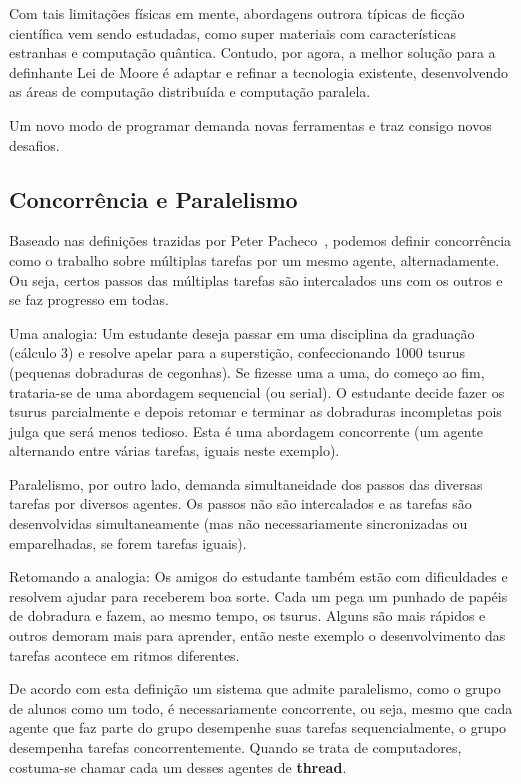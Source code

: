 \documentclass{article}
\begin{document}
Com tais limitações físicas em mente, abordagens outrora típicas de ficção científica vem sendo estudadas, como super materiais com características estranhas e computação quântica. Contudo, por agora, a melhor solução para a definhante Lei de Moore é adaptar e refinar a tecnologia existente, desenvolvendo as áreas de computação distribuída e computação paralela.

Um novo modo de programar demanda novas ferramentas e traz consigo novos desafios.

\subsection{Concorrência e Paralelismo}
\label{ssec:concorrencia e paralelismo}

Baseado nas definições trazidas por Peter Pacheco~\cite{pacheco11}, podemos definir concorrência como o trabalho sobre múltiplas tarefas por um mesmo agente, alternadamente. Ou seja, certos passos das múltiplas tarefas são intercalados uns com os outros e se faz progresso em todas.

Uma analogia: Um estudante deseja passar em uma disciplina da graduação (cálculo 3) e resolve apelar para a superstição, confeccionando 1000 tsurus (pequenas dobraduras de cegonhas). Se fizesse uma a uma, do começo ao fim, trataria-se de uma abordagem sequencial (ou serial). O estudante decide fazer os tsurus parcialmente e depois retomar e terminar as dobraduras incompletas pois julga que será menos tedioso. Esta é uma abordagem concorrente (um agente alternando entre várias tarefas, iguais neste exemplo).

Paralelismo, por outro lado, demanda simultaneidade dos passos das diversas tarefas por diversos agentes. Os passos não são intercalados e as tarefas são desenvolvidas simultaneamente (mas não necessariamente sincronizadas ou emparelhadas, se forem tarefas iguais).

Retomando a analogia: Os amigos do estudante também estão com dificuldades e resolvem ajudar para receberem boa sorte. Cada um pega um punhado de papéis de dobradura e fazem, ao mesmo tempo, os tsurus. Alguns são mais rápidos e outros demoram mais para aprender, então neste exemplo o desenvolvimento das tarefas acontece em ritmos diferentes.

De acordo com esta definição um sistema que admite paralelismo, como o grupo de alunos como um todo, é necessariamente concorrente, ou seja, mesmo que cada agente que faz parte do grupo desempenhe suas tarefas sequencialmente, o grupo desempenha tarefas concorrentemente. Quando se trata de computadores, costuma-se chamar cada um desses agentes de \textbf{thread}.
\end{document}
